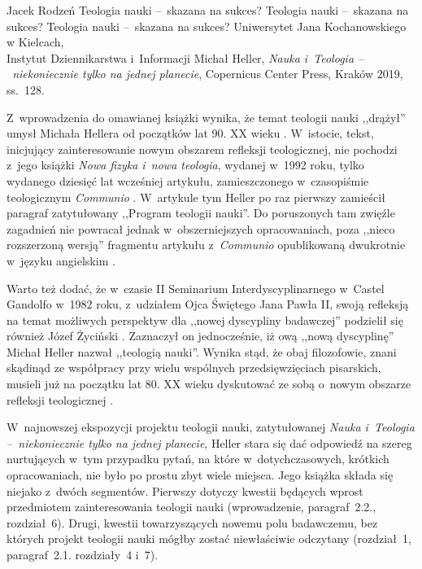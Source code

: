\begin{newrevplenv}{Jacek Rodzeń}
	{Teologia nauki --~skazana na sukces?}
	{Teologia nauki --~skazana na sukces?}
	{Teologia nauki --~skazana na sukces?}
	{Uniwersytet Jana Kochanowskiego w Kielcach,\\
	Instytut Dziennikarstwa i~Informacji}
	{Michał Heller, \textit{Nauka i~Teologia --~niekoniecznie tylko na jednej planecie}, Copernicus Center Press, Kraków 2019, ss.~128.\label{rodzen_anfang}}





\lettrine[loversize=0.13,lines=2,lraise=-0.03,nindent=0em,findent=0.2pt]%
{Z}{}~wprowadzenia do omawianej książki wynika, że temat teologii nauki ,,drążył'' umysł Michała Hellera od początków lat 90. XX wieku
\parencite[][s.~8]{heller_nauka_2019}. %
 W~istocie, tekst, inicjujący zainteresowanie nowym obszarem refleksji teologicznej, nie pochodzi z~jego książki \textit{Nowa fizyka i~nowa teologia}, wydanej w~1992 roku, tylko wydanego dziesięć lat wcześniej artykułu, zamieszczonego w~czasopiśmie teologicznym \textit{Communio}
\parencite[][]{heller_stworzenie_1982}. %
 W~artykule tym Heller po raz pierwszy zamieścił paragraf zatytułowany ,,Program teologii nauki''. Do poruszonych tam zwięźle zagadnień nie powracał jednak w~obszerniejszych opracowaniach, poza ,,nieco rozszerzoną wersją'' 
\parencite[][s.~8]{heller_nauka_2019} %
 fragmentu artykułu z~\textit{Communio} opublikowaną dwukrotnie w~języku angielskim 
\parencite[][]{heller_program_2003}.%


Warto też dodać, że w~czasie II Seminarium Interdyscyplinarnego w~Castel Gandolfo w~1982 roku, z~udziałem Ojca Świętego Jana Pawła II, swoją refleksją na temat możliwych perspektyw dla ,,nowej dyscypliny badawczej'' podzielił się również Józef Życiński
\parencite*[][]{zycinski_w_1984}. %
 Zaznaczył on jednocześnie, iż ową ,,nową dyscyplinę'' Michał Heller nazwał ,,teologią nauki''. Wynika stąd, że obaj filozofowie, znani skądinąd ze współpracy przy wielu wspólnych przedsięwzięciach pisarskich, musieli już na początku lat 80. XX wieku dyskutować ze sobą o~nowym obszarze refleksji teologicznej 
\parencite[więcej na ten temat zob.][]{polak_teologia_2015}.%


W~najnowszej ekspozycji projektu teologii nauki, zatytułowanej \textit{Nauka i~Teologia --~niekoniecznie tylko na jednej planecie}, Heller stara się dać odpowiedź na szereg nurtujących w~tym przypadku pytań, na które w~dotychczasowych, krótkich opracowaniach, nie było po prostu zbyt wiele miejsca. Jego książka składa się niejako z~dwóch segmentów. Pierwszy dotyczy kwestii będących wprost przedmiotem zainteresowania teologii nauki (wprowadzenie, paragraf~2.2., rozdział~6). Drugi, kwestii towarzyszących nowemu polu badawczemu, bez których projekt teologii nauki mógłby zostać niewłaściwie odczytany (rozdział~1, paragraf~2.1. rozdziały~4 i~7).


\end{newrevplenv}
